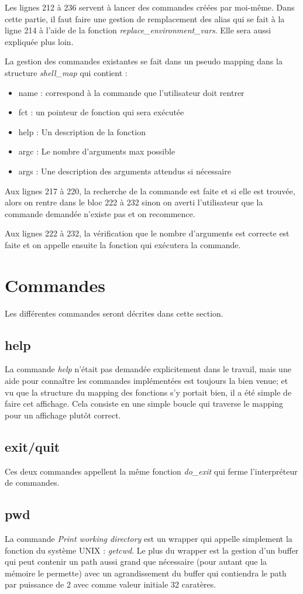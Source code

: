 \documentclass[a4paper,10pt]{article}
\begin{document}
Les lignes 212 à 236 servent à lancer des commandes créées par moi-même. Dans cette partie, il faut faire une gestion de remplacement des alias qui se fait à la ligne 214 à l'aide de la fonction \emph{replace\_environment\_vars}. Elle sera aussi expliquée plus loin.
\pagebreak

La gestion des commandes existantes se fait dans un pseudo mapping dans la structure \emph{shell\_map} qui contient :
\begin{itemize}
	\item name : correspond à la commande que l'utilisateur doit rentrer
	\item fct : un pointeur de fonction qui sera exécutée
	\item help : Un description de la fonction
	\item argc : Le nombre d'arguments max possible
	\item args : Une description des arguments attendus si nécessaire
\end{itemize}

Aux lignes 217 à 220, la recherche de la commande est faite et si elle est trouvée, alors on rentre dans le bloc 222 à 232 sinon on averti l'utilisateur que la commande demandée n'existe pas et on recommence.

Aux lignes 222 à 232, la vérification que le nombre d'arguments est correcte est faite et on appelle ensuite la fonction qui exécutera la commande.

\section{Commandes}
Les différentes commandes seront décrites dans cette section.
\subsection{help}
La commande \emph{help} n'était pas demandée explicitement dans le travail, mais une aide pour connaître les commandes implémentées est toujours la bien venue; et vu que la structure du mapping des fonctions s'y portait bien, il a été simple de faire cet affichage. Cela consiste en une simple boucle qui traverse le mapping pour un affichage plutôt correct.
\subsection{exit/quit}
Ces deux commandes appellent la même fonction \emph{do\_exit} qui ferme l'interpréteur de commandes.
\subsection{pwd}
La commande \emph{Print working directory} est un wrapper qui appelle simplement la fonction du système UNIX : \emph{getcwd}. Le plus du wrapper est la gestion d'un buffer qui peut contenir un path aussi grand que nécessaire (pour autant que la mémoire le permette) avec un agrandissement du buffer qui contiendra le path par puissance de 2 avec comme valeur initiale 32 caratères.
\end{document}
